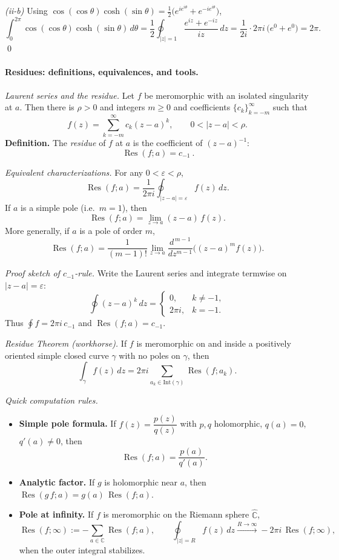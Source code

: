 \documentclass[11pt,a4paper]{article}
\theoremstyle{definition}
\theoremstyle{definition}
\theoremstyle{plain}
\theoremstyle{remark}
\DeclareMathOperator{\Res}{Res}
\begin{document}
\medskip
\emph{(ii-b)} Using
$\cos(\cos\theta)\cosh(\sin\theta)=\tfrac12\big(e^{i e^{i\theta}}+e^{-i e^{i\theta}}\big)$,
\[
\int_{0}^{2\pi}\cos(\cos\theta)\cosh(\sin\theta)\,d\theta
=\frac12\oint_{|z|=1}\frac{e^{iz}+e^{-iz}}{iz}\,dz
=\frac{1}{2i}\cdot 2\pi i\,\bigl(e^{0}+e^{0}\bigr)=2\pi.
\]
\qed



\paragraph{Residues: definitions, equivalences, and tools.}

\medskip
\emph{Laurent series and the residue.}
Let $f$ be meromorphic with an isolated singularity at $a$.
Then there is $\rho>0$ and integers $m\ge 0$ and coefficients $\{c_k\}_{k=-m}^{\infty}$ such that
\[
f(z)=\sum_{k=-m}^{\infty} c_k (z-a)^k, \qquad 0<|z-a|<\rho .
\]
\textbf{Definition.} The \emph{residue} of $f$ at $a$ is the coefficient of $(z-a)^{-1}$:
\[
\boxed{\ \Res(f;a)=c_{-1}\ }.
\]

\medskip
\emph{Equivalent characterizations.}
For any $0<\varepsilon<\rho$,
\[
\Res(f;a)=\frac{1}{2\pi i}\oint_{|z-a|=\varepsilon} f(z)\,dz.
\]
If $a$ is a simple pole (i.e.\ $m=1$), then
\[
\Res(f;a)=\lim_{z\to a} (z-a)\,f(z).
\]
More generally, if $a$ is a pole of order $m$,
\[
\Res(f;a)=\frac{1}{(m-1)!}\lim_{z\to a}\frac{d^{\,m-1}}{dz^{m-1}}\big((z-a)^m f(z)\big).
\]

\smallskip
\emph{Proof sketch of $c_{-1}$-rule.}
Write the Laurent series and integrate termwise on $|z-a|=\varepsilon$:
\[
\oint (z-a)^k\,dz = \begin{cases}
	0, & k\neq -1,\\[2pt]
	2\pi i, & k=-1.
\end{cases}
\]
Thus $\displaystyle \oint f = 2\pi i\,c_{-1}$ and $\Res(f;a)=c_{-1}$.

\medskip
\emph{Residue Theorem (workhorse).}
If $f$ is meromorphic on and inside a positively oriented simple closed curve $\gamma$
with no poles on $\gamma$, then
\[
\int_{\gamma} f(z)\,dz
= 2\pi i \sum_{a_k\in \mathrm{Int}(\gamma)} \Res(f;a_k).
\]

\medskip
\emph{Quick computation rules.}
\begin{itemize}
	\item \textbf{Simple pole formula.} If $f(z)=\dfrac{p(z)}{q(z)}$ with $p,q$ holomorphic,
	$q(a)=0$, $q'(a)\neq 0$, then
	\[
	\Res(f;a)=\frac{p(a)}{q'(a)}.
	\]
	\item \textbf{Analytic factor.} If $g$ is holomorphic near $a$, then
	$\Res(g\,f;a)=g(a)\,\Res(f;a)$.
	\item \textbf{Pole at infinity.} If $f$ is meromorphic on the Riemann sphere $\widehat{\mathbb C}$,
	\[
	\Res(f;\infty) := -\sum_{a\in\mathbb C}\Res(f;a),\qquad
	\oint_{|z|=R} f(z)\,dz \xrightarrow{R\to\infty} -2\pi i\,\Res(f;\infty),
	\]
	when the outer integral stabilizes.
\end{itemize}
\end{document}
